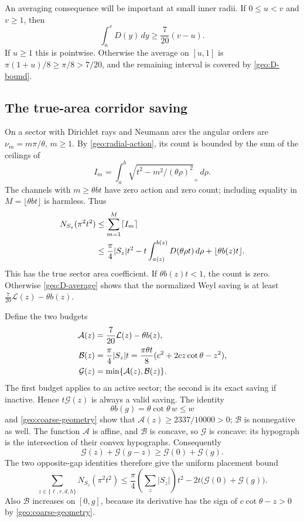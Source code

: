 \documentclass[11pt,reqno]{amsart}
\numberwithin{equation}{section}
\begin{document}
An averaging consequence will be important at small inner radii.  If
$0\le u<v$ and $v\ge1$, then
\begin{equation}\label{geo:D-average}
 \int_u^vD(y)\,dy\ge\frac7{20}(v-u).
\end{equation}
If $u\ge1$ this is pointwise.  Otherwise the average on $[u,1]$ is
$\pi(1+u)/8\ge\pi/8>7/20$, and the remaining interval is covered by
\eqref{geo:D-bound}.

\subsection{The true-area corridor saving}
\label{geo:corridor-count}

On a sector with Dirichlet rays and Neumann arcs the angular orders are
$\nu_m=m\pi/\theta$, $m\ge1$.  By \eqref{geo:radial-action}, its count
is bounded by the sum of the ceilings of
\[
 I_m=\int_a^b\sqrt{t^2-m^2/(\theta\rho)^2}_+\,d\rho.
\]
The channels with $m\ge\theta bt$ have zero action and zero count;
including equality in $M=\lfloor\theta bt\rfloor$ is harmless.  Thus
\begin{align}
 N_{S_z}(\pi^2t^2)
 &\le\sum_{m=1}^{M}\lceil I_m\rceil\notag\\
 &\le\frac{\pi}{4}|S_z|t^2
       -t\int_{a(z)}^{b(z)}D(\theta\rho t)\,d\rho
       +\lfloor\theta b(z)t\rfloor.\label{geo:sector-count}
\end{align}
This has the true sector area coefficient.  If $\theta b(z)t<1$, the
count is zero.  Otherwise \eqref{geo:D-average} shows that the normalized
Weyl saving is at least
$\tfrac7{20}\mathcal L(z)-\theta b(z)$.

Define the two budgets
\begin{align}
 \mathcal A(z)&=\frac7{20}\mathcal L(z)-\theta b(z),\notag\\
 \mathcal B(z)&=\frac\pi4|S_z|t
        =\frac{\pi\theta t}{8}
                    (c^2+2cz\cot\theta-z^2),\notag\\
 \mathcal G(z)&=\min\{\mathcal A(z),\mathcal B(z)\}.
                                                    \label{geo:budgets}
\end{align}
The first budget applies to an active sector; the second is its exact
saving if inactive.  Hence $t\mathcal G(z)$ is always a valid saving.
The identity
\[
 \theta b(g)=\theta\cot\theta\,w\le w
\]
and \eqref{geo:coarse-geometry} show that
$\mathcal A(z)\ge2337/10000>0$; $\mathcal B$ is nonnegative as well.
The function $\mathcal A$ is affine, and $\mathcal B$ is concave, so
$\mathcal G$ is concave: its hypograph is the intersection of their
convex hypographs.  Consequently
\[
 \mathcal G(z)+\mathcal G(g-z)\ge\mathcal G(0)+\mathcal G(g).
\]
The two opposite-gap identities therefore give the uniform placement
bound
\begin{equation}\label{geo:sector-total}
 \sum_{z\in\{\ell,r,d,h\}}N_{S_z}(\pi^2t^2)
 \le\frac\pi4\left(\sum_z|S_z|\right)t^2
                  -2t\bigl(\mathcal G(0)+\mathcal G(g)\bigr).
\end{equation}
Also $\mathcal B$ increases on $[0,g]$, because its derivative has the
sign of $c\cot\theta-z>0$ by \eqref{geo:coarse-geometry}.
\end{document}
